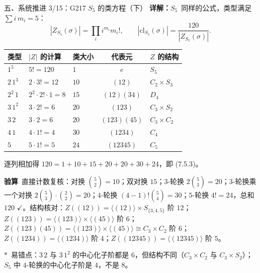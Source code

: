\documentclass[aspectratio=169,10pt,fontset=none]{ctexbeamer}
\newcommand{\key}[1]{\textcolor{ink}{\bfseries #1}}
\newcommand{\starpt}{\textcolor{accent}{\bfseries$\ast$}}
\begin{document}
\begin{frame}[t]{五、系统推进 3/15：G217 $S_5$ 的类方程（下）}
\scriptsize
\key{详解：$S_5$}\ 同样的公式，类型满足 $\sum i\,m_i=5$：
\[
|Z_{S_5}(\sigma)|=\prod_i i^{m_i}m_i!,\qquad |\mathrm{cl}_{S_5}(\sigma)|=\frac{120}{|Z_{S_5}(\sigma)|}.
\]
\begin{center}
\begin{tabular}{@{}lllcl@{}}
\toprule
类型 & $|Z|$ 的计算 & 类大小 & 代表元 & $Z$ 的结构\\
\midrule
$1^5$ & $5!=120$ & $1$ & $e$ & $S_5$\\
$2\,1^3$ & $2\cdot 3!=12$ & $10$ & $(12)$ & $C_2\times S_3$\\
$2^2\,1$ & $2^2\cdot 2!\cdot 1=8$ & $15$ & $(12)(34)$ & $D_4$\\
$3\,1^2$ & $3\cdot 2!=6$ & $20$ & $(123)$ & $C_3\times S_2$\\
$3\,2$ & $3\cdot 2=6$ & $20$ & $(123)(45)$ & $C_3\times C_2$\\
$4\,1$ & $4\cdot 1!=4$ & $30$ & $(1234)$ & $C_4$\\
$5$ & $5\cdot 1!=5$ & $24$ & $(12345)$ & $C_5$\\
\bottomrule
\end{tabular}
\end{center}
逐列相加得 $120=1+10+15+20+20+30+24$，即 (7.5.3)。

\key{验算}\ 直接计数复核：对换 $\binom52=10$；双对换 $15$；$3$-轮换 $2\binom53=20$；$3$-轮换乘一个对换 $2\binom53\cdot\binom22=20$；$4$-轮换 $(4-1)!\binom54=30$；$5$-轮换 $4!=24$，总和 $120$ $\checkmark$。结构核对：$Z((12))=\langle(12)\rangle\times S_{\{3,4,5\}}$ 阶 $12$；$Z((123))=\langle(123)\rangle\times\langle(45)\rangle$ 阶 $6$；$Z((123)(45))=\langle(123)\rangle\times\langle(45)\rangle\cong C_3\times C_2$ 阶 $6$；$Z((1234))=\langle(1234)\rangle$ 阶 $4$；$Z((12345))=\langle(12345)\rangle$ 阶 $5$。

\starpt\ 易错点：$3\,2$ 与 $3\,1^2$ 的中心化子阶都是 $6$，但结构不同（$C_3\times C_2$ 与 $C_3\times S_2$）；$S_5$ 中 $4$-轮换的中心化子阶是 $4$，不是 $8$。
\end{frame}
\end{document}
